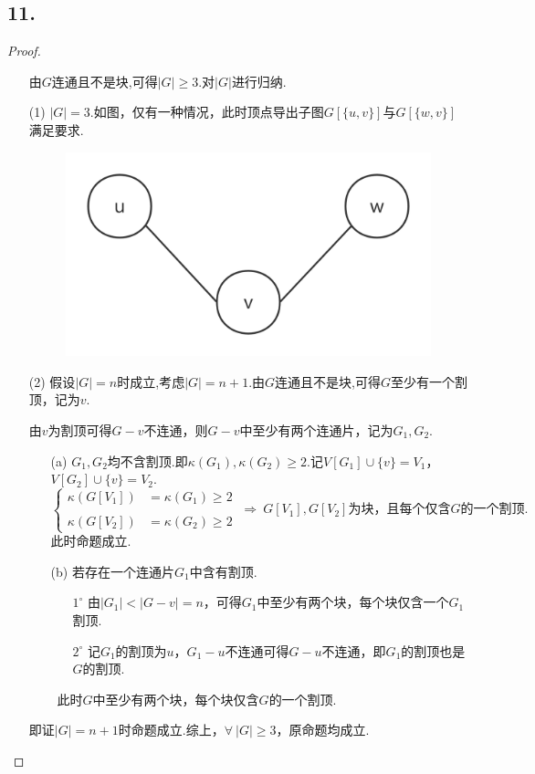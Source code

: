 \documentclass{article}
\begin{document}
\subsection*{11.}
\begin{proof}
    \begin{enumerate}
        \item []由$G$连通且不是块,可得$|G|\geq 3$.对$|G|$进行归纳.
        \item [(1)]$|G|=3$.如图，仅有一种情况，此时顶点导出子图$G[\{u,v\}]$与$G[\{w,v\}]$满足要求.
        \begin{figure}[H]
            \centering
            \includegraphics[scale=0.2]{1.png}
        \end{figure}
        \item [(2)]假设$|G|=n$时成立,考虑$|G|=n+1$.由$G$连通且不是块,可得$G$至少有一个割顶，记为$v$.
        
        由$v$为割顶可得$G-v$不连通，则$G-v$中至少有两个连通片，记为$G_1,G_2$.
        \begin{enumerate}
            \item [(a)]$G_1,G_2$均不含割顶.即$\kappa(G_1),\kappa(G_2)\geq 2$.记$V[G_1]\cup \{v\}=V_1$，$V[G_2]\cup \{v\}=V_2$.
            \[
                \begin{cases}
                    \kappa (G[V_1]) & =\kappa (G_1) \geq 2\\
                    \\
                    \kappa (G[V_2]) & =\kappa (G_2) \geq 2
                \end{cases}
                \ \Rightarrow\ 
                G[V_1],G[V_2] \mbox{为块，且每个仅含$G$的一个割顶}.
            \]
            此时命题成立.
            \item [(b)]若存在一个连通片$G_1$中含有割顶.
            \begin{enumerate}
                \item [$1^\circ$]由$|G_1|<|G-v|=n$，可得$G_1$中至少有两个块，每个块仅含一个$G_1$割顶.
                \item [$2^\circ$]记$G_1$的割顶为$u$，$G_1-u$不连通可得$G-u$不连通，即$G_1$的割顶也是$G$的割顶.
            \end{enumerate}\
            此时$G$中至少有两个块，每个块仅含$G$的一个割顶.
        \end{enumerate}
        即证$|G|=n+1$时命题成立.综上，$\forall\ |G|\geq 3$，原命题均成立.
    \end{enumerate}
\end{proof}
\end{document}
